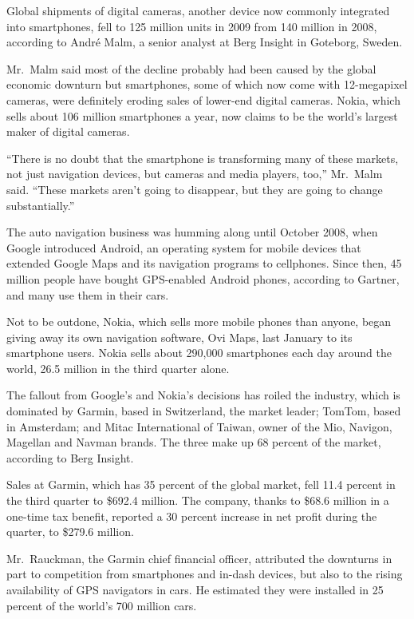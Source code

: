﻿\documentclass[12pt]{article}
\begin{document}
Global shipments of digital cameras, another device now commonly integrated into smartphones, fell
to 125 million units in 2009 from 140 million in 2008, according to Andr\'e Malm, a senior analyst
at Berg Insight in Goteborg, Sweden.

Mr.~Malm said most of the decline probably had been caused by the global economic downturn but
smartphones, some of which now come with 12-megapixel cameras, were definitely eroding sales of
lower-end digital cameras. Nokia, which sells about 106 million smartphones a year, now claims to be
the world's largest maker of digital cameras.

``There is no doubt that the smartphone is transforming many of these markets, not just navigation
devices, but cameras and media players, too,'' Mr.~Malm said. ``These markets aren't going to
disappear, but they are going to change substantially.''

The auto navigation business was humming along until October 2008, when Google introduced Android,
an operating system for mobile devices that extended Google Maps and its navigation programs to
cellphones. Since then, 45 million people have bought GPS-enabled Android phones, according to
Gartner, and many use them in their cars.

Not to be outdone, Nokia, which sells more mobile phones than anyone, began giving away its own
navigation software, Ovi Maps, last January to its smartphone users. Nokia sells about 290,000
smartphones each day around the world, 26.5 million in the third quarter alone.

The fallout from Google's and Nokia's decisions has roiled the industry, which is dominated by
Garmin, based in Switzerland, the market leader; TomTom, based in Amsterdam; and Mitac International
of Taiwan, owner of the Mio, Navigon, Magellan and Navman brands. The three make up 68 percent of
the market, according to Berg Insight.

Sales at Garmin, which has 35 percent of the global market, fell 11.4 percent in the third quarter
to \$692.4 million. The company, thanks to \$68.6 million in a one-time tax benefit, reported a 30
percent increase in net profit during the quarter, to \$279.6 million.

Mr.~Rauckman, the Garmin chief financial officer, attributed the downturns in part to competition
from smartphones and in-dash devices, but also to the rising availability of GPS navigators in cars.
He estimated they were installed in 25 percent of the world's 700 million cars.
\end{document}
